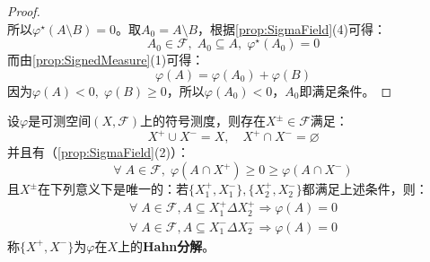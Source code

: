 \begin{proof}
\begin{equation*}
	\end{equation*}
	所以$\varphi^{\star}(A\setminus B)=0$。取$A_0=A\setminus B$，根据\cref{prop:SigmaField}(4)可得：
	\begin{equation*}
		A_0\in\mathscr{F},\;A_0\subseteq A,\;\varphi^{\star}(A_0)=0
	\end{equation*}
	而由\cref{prop:SignedMeasure}(1)可得：
	\begin{equation*}
		\varphi(A)=\varphi(A_0)+\varphi(B)
	\end{equation*}
	因为$\varphi(A)<0,\;\varphi(B)\geqslant0$，所以$\varphi(A_0)<0$，$A_0$即满足条件。
\end{proof}
\begin{theorem}\label{theo:HahnDecomposition}
	设$\varphi$是可测空间$(X,\mathscr{F})$上的符号测度，则存在$X^{\pm}\in\mathscr{F}$满足：
	\begin{equation*}
		X^+\cup X^-=X,\quad X^+\cap X^-=\varnothing
	\end{equation*}
	并且有（\cref{prop:SigmaField}(2)）：
	\begin{equation*}
		\forall\;A\in\mathscr{F},\;\varphi(A\cap X^+)\geqslant0\geqslant\varphi(A\cap X^-)
	\end{equation*}
	且$X^{\pm}$在下列意义下是唯一的：若$\{X^+_1,X^-_1\},\{X^+_2,X^-_2\}$都满足上述条件，则：
	\begin{gather*}
		\forall\;A\in\mathscr{F},A\subseteq X^+_1\Delta X^+_2\Rightarrow\varphi(A)=0 \\
		\forall\;A\in\mathscr{F},A\subseteq X^-_1\Delta X^-_2\Rightarrow\varphi(A)=0
	\end{gather*}
	称$\{X^+,X^-\}$为$\varphi$在$X$上的\textbf{Hahn分解}。
\end{theorem}
